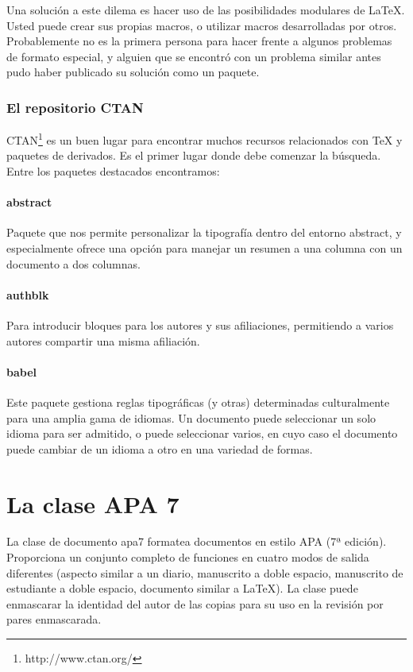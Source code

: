 \documentclass[12pt,letterpaper,jou]{apa7} %
\begin{document}
Una solución a este dilema es hacer uso de las posibilidades modulares de LaTeX. Usted puede crear sus propias macros, o utilizar macros desarrolladas por otros. Probablemente no es la primera persona para hacer frente a algunos problemas de formato especial, y alguien que se encontró con un problema similar antes pudo haber publicado su solución como un paquete.

\subsubsection{El repositorio CTAN}

CTAN\footnote{http://www.ctan.org/} es un buen lugar para encontrar muchos recursos relacionados con TeX y paquetes de derivados. Es el primer lugar donde debe comenzar la búsqueda. Entre los paquetes destacados encontramos:

\paragraph{abstract} Paquete que nos permite personalizar la tipografía dentro del entorno abstract, y especialmente ofrece una opción para manejar un resumen a una columna con un documento a dos columnas.

\paragraph{authblk} Para introducir bloques para los autores y sus afiliaciones, permitiendo a varios autores compartir una misma afiliación.

\paragraph{babel} Este paquete gestiona reglas tipográficas (y otras) determinadas culturalmente para una amplia gama de idiomas. Un documento puede seleccionar un solo idioma para ser admitido, o puede seleccionar varios, en cuyo caso el documento puede cambiar de un idioma a otro en una variedad de formas.

\section{La clase APA 7}

La clase de documento apa7  formatea documentos en estilo APA (7ª edición). Proporciona un conjunto completo de funciones en cuatro modos de salida diferentes (aspecto similar a un diario, manuscrito a doble espacio, manuscrito de estudiante a doble espacio, documento similar a LaTeX). La clase puede enmascarar la identidad del autor de las copias para su uso en la revisión por pares enmascarada.
\end{document}
